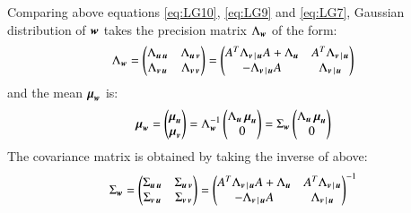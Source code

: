 Comparing above equations \ref{eq:LG10}, \ref{eq:LG9} and \ref{eq:LG7}, Gaussian distribution of $ \operatorname{\boldsymbol{w}} $ takes the precision matrix $ \Lambda_{\operatorname{\boldsymbol{w}}} $ of the form:
\begin{equation}
	\Lambda_{\mybold{w}}= \left(\begin{matrix}\Lambda_{\mybold{u}\mybold{u}} & \Lambda_{\mybold{u}\mybold{v}} \\ \Lambda_{\mybold{v}\mybold{u}} & \Lambda_{\mybold{v}\mybold{v}}\end{matrix}\right) = \left(\begin{matrix}A^T\Lambda_{\mybold{v}|\mybold{u}}A+\Lambda_{\mybold{u}} & A^T\Lambda_{\mybold{v}|\mybold{u}} \\ -\Lambda_{\mybold{v}|\mybold{u}} A & \Lambda_{\mybold{v}|\mybold{u}}\end{matrix}\right)
\label{eq:LG11}
\end{equation}
and the mean $ \operatorname{\boldsymbol{\mu}}_{\operatorname{\boldsymbol{w}}} $ is:
\begin{equation}
	\mybold{\mu}_{\mybold{w}} = \left(\begin{matrix}\mybold{\mu}_{\mybold{u}} \\ \mybold{\mu}_{\mybold{v}} \end{matrix}\right) = \Lambda_{\mybold{w}}^{-1}\left(\begin{matrix}\Lambda_{\mybold{u}}\mybold{\mu}_{\mybold{u}} \\ 0 \end{matrix}\right) =\Sigma_{\mybold{w}} \left(\begin{matrix}\Lambda_{\mybold{u}}\mybold{\mu}_{\mybold{u}} \\ 0 \end{matrix}\right)
\label{eq:LG12}
\end{equation}
The covariance matrix is obtained by taking the inverse of above:
\begin{equation}
	\Sigma_{\mybold{w}}=\left(\begin{matrix}\Sigma_{\mybold{u}\mybold{u}} & \Sigma_{\mybold{u}\mybold{v}} \\ \Sigma_{\mybold{v}\mybold{u}} & \Sigma_{\mybold{v}\mybold{v}}\end{matrix}\right) = \left(\begin{matrix}A^T\Lambda_{\mybold{v}|\mybold{u}}A+\Lambda_{\mybold{u}} & A^T\Lambda_{\mybold{v}|\mybold{u}} \\ -\Lambda_{\mybold{v}|\mybold{u}} A & \Lambda_{\mybold{v}|\mybold{u}}\end{matrix}\right)^{-1} 
\label{eq:LG13}
\end{equation}
